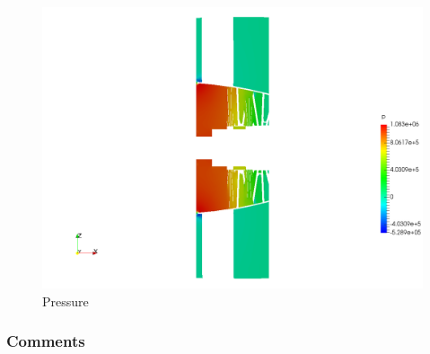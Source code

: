 \begin{figure}[h!]
\centering
\includegraphics[scale=0.28]{./img/screenshoots/p2.png}
\caption{Pressure}
\label{p2}
\end{figure}

\newpage\subsubsection{Comments}

